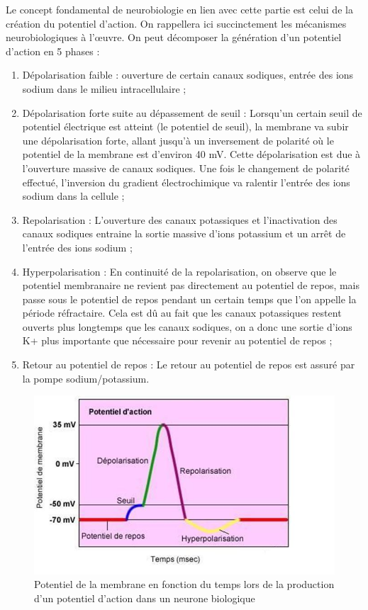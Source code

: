 \documentclass[12pt]{scrartcl}
\begin{document}
Le concept fondamental de neurobiologie en lien avec cette partie est celui de la création du potentiel d'action. On rappellera ici succinctement les mécanismes neurobiologiques à l'œuvre. On peut décomposer la génération d'un potentiel d'action en 5 phases :
\begin{enumerate} \item Dépolarisation faible : ouverture de certain canaux sodiques, entrée des ions sodium dans le milieu intracellulaire ;
\item Dépolarisation forte suite au dépassement de seuil : Lorsqu'un certain seuil de potentiel électrique est atteint (le potentiel de seuil), la membrane va subir une dépolarisation forte, allant jusqu'à un inversement de polarité où le potentiel de la membrane est d'environ 40 mV. Cette dépolarisation est due à l'ouverture massive de canaux sodiques. Une fois le changement de polarité effectué, l'inversion du gradient électrochimique va ralentir l'entrée des ions sodium dans la cellule ;
\item Repolarisation : L'ouverture des canaux potassiques et l'inactivation des canaux sodiques entraine la sortie massive d'ions potassium et un arrêt de l'entrée des ions sodium ;
\item Hyperpolarisation : En continuité de la repolarisation, on observe que le potentiel membranaire ne revient pas directement au potentiel de repos, mais passe sous le potentiel de repos pendant un certain temps que l'on appelle la période réfractaire. Cela est dû au fait que les canaux potassiques restent ouverts plus longtemps que les canaux sodiques, on a donc une sortie d'ions K+ plus importante que nécessaire pour revenir au potentiel de repos ;
\item Retour au potentiel de repos : Le retour au potentiel de repos est assuré par la pompe sodium/potassium.
\end{enumerate}

\begin{figure}[!h]
\centering
\includegraphics{imgs/2.JPG}
\caption{Potentiel de la membrane en fonction du temps lors de la production d'un potentiel d'action dans un neurone biologique}
\end{figure}
\end{document}
